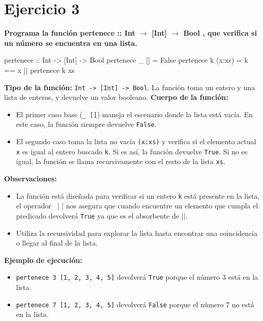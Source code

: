 \documentclass{article}
\begin{document}
\section*{Ejercicio 3}

\textbf{Programa la función pertenece :: Int $\rightarrow$ [Int] $\rightarrow$ Bool , que verifica si un número se encuentra en una lista.}
\begin{haskell}
pertenece :: Int -> [Int] -> Bool
pertenece _ [] = False
pertenece k (x:xs) = k == x || pertenece k xs
\end{haskell}    
    \textbf{Tipo de la función:} \verb|Int -> [Int] -> Bool|. La función toma un entero y una lista de enteros, y devuelve un valor booleano. \newline
    \textbf{Cuerpo de la función:}
    \begin{itemize}
    \item El primer caso base (\verb|_ []|) maneja el escenario donde la lista está vacía. En este caso, la función siempre devuelve \verb|False|.
    \item El segundo caso toma la lista no vacía \verb|(x:xs)| y verifica si el elemento actual \verb|x| es igual al entero buscado \verb|k|. Si es así, la función devuelve \verb|True|. Si no es igual, la función se llama recursivamente con el resto de la lista \verb|xs|.
    \end{itemize}
    \textbf{Observaciones:}
    \begin{itemize}
    \item La función está diseñada para verificar si un entero \verb|k| está presente en la lista, el operador \verb| || | nos asegura que cuando encuentre un elemento que cumpla el predicado devolverá \verb|True| ya que es el absorbente de \verb||||.
    \item Utiliza la recursividad para explorar la lista hasta encontrar una coincidencia o llegar al final de la lista.
    \end{itemize}
    \textbf{Ejemplo de ejecución:}
    \begin{itemize}
    \item \verb|pertenece 3 [1, 2, 3, 4, 5]| devolverá \verb|True| porque el número 3 está en la lista.
    \item \verb|pertenece 7 [1, 2, 3, 4, 5]| devolverá \verb|False| porque el número 7 no está en la lista.
    \end{itemize}
\end{document}
